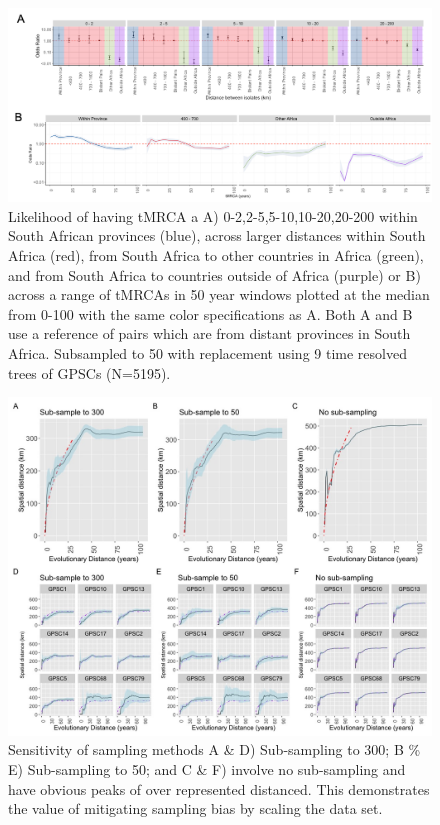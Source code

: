 \documentclass{article}
\begin{document}
\begin{figure}[H]
\centering
    \includegraphics[width=\textwidth]{timeanddistance.png}
    \caption{Likelihood of having tMRCA a A) 0-2,2-5,5-10,10-20,20-200 within South African provinces (blue), across larger distances within South Africa (red), from South Africa to other countries in Africa (green), and from South Africa to countries outside of Africa (purple) or B) across a range of tMRCAs in 50 year windows plotted at the median from 0-100 with the same color specifications as A. Both A and B use a reference of pairs which are from distant provinces in South Africa. Subsampled to 50 with replacement using 9 time resolved trees of GPSCs (N=5195).}
      \label{fig:timedistance}
\end{figure}
\begin{figure}[H]
\centering
    \includegraphics[width=\textwidth]{sensitivity_sampling.jpeg}
    \caption{Sensitivity of sampling methods A \& D) Sub-sampling to 300; B \% E) Sub-sampling to 50; and C \& F) involve no sub-sampling and have obvious peaks of over represented distanced. This demonstrates the value of mitigating sampling bias by scaling the data set.}
      \label{fig:sensanalysis}
\end{figure}
\end{document}
